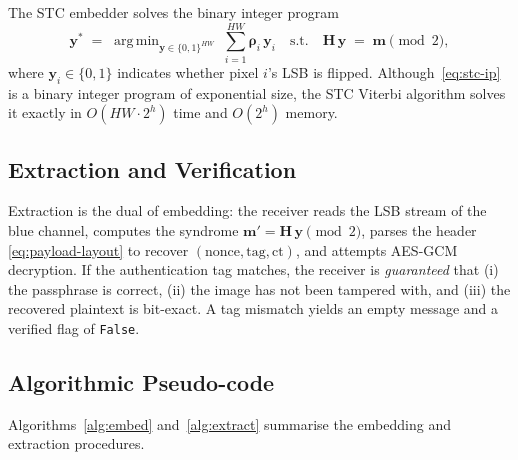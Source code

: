 \documentclass[10pt,a4paper]{article}
\newcommand{\cost}{\boldsymbol{\rho}}
\newcommand{\msg}{\mathbf{m}}
\newcommand{\modv}{\mathbf{y}}
\newcommand{\Hmat}{\mathbf{H}}
\DeclareMathOperator*{\argmin}{arg\,min}
\begin{document}
The STC embedder solves the binary integer program
\begin{equation}
\modv^{*} \;=\; \argmin_{\modv \in \{0,1\}^{HW}}
\; \sum_{i=1}^{HW} \cost_i \, \modv_i
\quad \text{s.t.} \quad
\Hmat \, \modv \;=\; \msg \pmod 2,
\label{eq:stc-ip}
\end{equation}
where $\modv_i \in \{0,1\}$ indicates whether pixel $i$'s LSB is
flipped. Although~\eqref{eq:stc-ip} is a binary integer program of
exponential size, the STC Viterbi algorithm solves it exactly in
$O(HW \cdot 2^h)$ time and $O(2^h)$ memory.

\subsection{Extraction and Verification}
\label{sec:method-extract}

Extraction is the dual of embedding: the receiver reads the LSB stream
of the blue channel, computes the syndrome
$\msg' = \Hmat \, \modv \pmod 2$, parses the header
\eqref{eq:payload-layout} to recover
$(\text{nonce}, \text{tag}, \text{ct})$, and attempts AES-GCM
decryption. If the authentication tag matches, the receiver is
\emph{guaranteed} that (i) the passphrase is correct, (ii) the
image has not been tampered with, and (iii) the recovered plaintext is
bit-exact. A tag mismatch yields an empty message and a verified
flag of \texttt{False}.

\subsection{Algorithmic Pseudo-code}
\label{sec:method-algo}

Algorithms~\ref{alg:embed} and~\ref{alg:extract} summarise the
embedding and extraction procedures.
\end{document}
